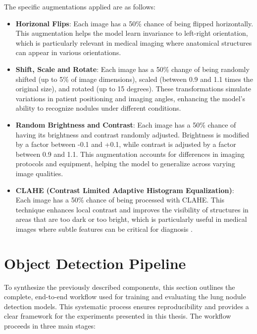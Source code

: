 The specific augmentations applied are as follows:
\begin{itemize}
    \item \textbf{Horizonal Flips}: Each image has a 50\% chance of being flipped horizontally. This augmentation helps the model learn invariance to left-right orientation, which is particularly relevant in medical imaging where anatomical structures can appear in various orientations.
    \item \textbf{Shift, Scale and Rotate}: Each image has a 50\% change of being randomly shifted (up to 5\% of image dimensions), scaled (between 0.9 and 1.1 times the original size), and rotated (up to 15 degrees). These transformations simulate variations in patient positioning and imaging angles, enhancing the model's ability to recognize nodules under different conditions.
    \item \textbf{Random Brightness and Contrast}: Each image has a 50\% chance of having its brightness and contrast randomly adjusted. Brightness is modified by a factor between -0.1 and +0.1, while contrast is adjusted by a factor between 0.9 and 1.1. This augmentation accounts for differences in imaging protocols and equipment, helping the model to generalize across varying image qualities.
    \item \textbf{CLAHE (Contrast Limited Adaptive Histogram Equalization)}: \\Each image has a 50\% chance of being processed with CLAHE. This technique enhances local contrast and improves the visibility of structures in areas that are too dark or too bright, which is particularly useful in medical images where subtle features can be critical for diagnosis \cite{mishra2021clahe}.
\end{itemize}


\section{Object Detection Pipeline}
To synthesize the previously described components, this section outlines the complete, end-to-end workflow used for training and evaluating the lung nodule detection models. This systematic process ensures reproducibility and provides a clear framework for the experiments presented in this thesis. The workflow proceeds in three main stages:

